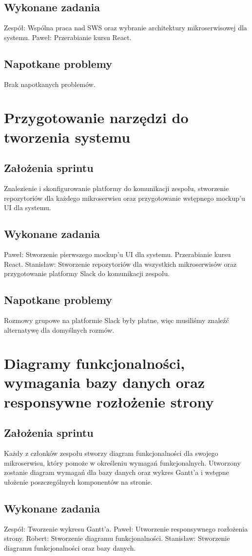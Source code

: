 \documentclass[a4paper,11pt]{report}
\begin{document}
\subsection {Wykonane zadania}
Zespół: Wspólna praca nad SWS oraz wybranie architektury mikroserwisowej dla systemu.
Paweł: Przerabianie kursu React.
\subsection {Napotkane problemy}
Brak napotkanych problemów.

\section {Przygotowanie narzędzi do tworzenia systemu}
\subsection {Założenia sprintu}
Znalezienie i skonfigurowanie platformy do komunikacji zespołu, stworzenie repozytoriów dla każdego mikroserwisu oraz przygotowanie wstępnego mockup'u UI dla systemu.
\subsection {Wykonane zadania}
Paweł: Stworzenie pierwszego mockup'u UI dla systemu. Przerabianie kursu React. 
Stanisław: Stworzenie repozytoriów dla wszystkich mikroserwisów oraz przygotowanie platformy Slack do komunikacji zespołu.
\subsection {Napotkane problemy}
Rozmowy grupowe na platformie Slack były płatne, więc musiliśmy znaleźć alternatywę dla domyślnych rozmów.

\section {Diagramy funkcjonalności, wymagania bazy danych oraz responsywne rozłożenie strony}
\subsection {Założenia sprintu}
Każdy z członków zespołu stworzy diagram funkcjonalności dla swojego mikroserwisu, który pomoże w określeniu wymagań funkcjonalnych. Utworzony zostanie diagram wymagań dla bazy danych oraz wykres Gantt’a i wstępne ułożenie poszczególnych komponentów na stronie.
\subsection {Wykonane zadania}
Zespół: Tworzenie wykresu Gantt'a.
Paweł: Utworzenie responsywnego rozłożenia strony. 
Robert: Stworzenie diagramu funkcjonalności. 
Stanisław: Stworzenie diagramu funkcjonalności oraz bazy danych.
\end{document}
